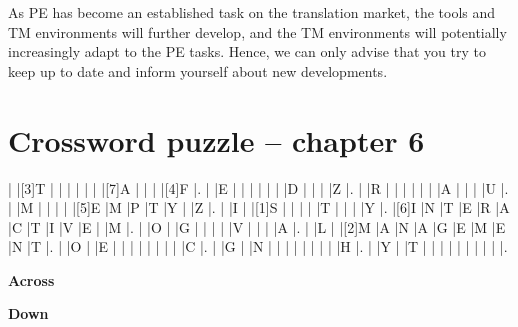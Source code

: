 As PE has become an established task on the translation market, the tools and TM environments will further develop, and the TM environments will potentially increasingly adapt to the PE tasks. Hence, we can only advise that you try to keep up to date and inform yourself about new developments.

\newpage

\section*{Crossword puzzle -- chapter 6}

\begin{Puzzle}{13}{11}
|{}	|[3]T	|{}	|{}	|{}	|{}	|{}	|{}	|[7]A	|{}	|{}	|{}	|[4]F	|.
|{}	|E	|{}	|{}	|{}	|{}	|{}	|{}	|D	|{}	|{}	|{}	|Z |.
|{}	|R	|{}	|{}	|{}	|{}	|{}	|{}	|A	|{}	|{}	|{}	|U |.
|{}	|M	|{}	|{}	|{}	|{}	|[5]E	|M	|P	|T	|Y	|{}	|Z |.
|{}	|I	|{}	|[1]S	|{}	|{}	|{}	|{}	|T	|{}	|{}	|{}	|Y |.
|[6]I	|N	|T	|E	|R	|A	|C	|T	|I	|V	|E	|{}	|M |.
|{}	|O	|{}	|G	|{}	|{}	|{}	|{}	|V	|{}	|{}	|{}	|A |.
|{}	|L	|{}	|[2]M	|A	|N	|A	|G	|E	|M	|E	|N	|T |.
|{}	|O	|{}	|E	|{}	|{}	|{}	|{}	|{}	|{}	|{}	|{}	|C |.
|{}	|G	|{}	|N	|{}	|{}	|{}	|{}	|{}	|{}	|{}	|{}	|H |.
|{}	|Y	|{}	|T	|{}	|{}	|{}	|{}	|{}	|{}	|{}	|{}	|{} |.
\end{Puzzle}

\begin{PuzzleClues}{\textbf{Across}}
\end{PuzzleClues}

\begin{PuzzleClues}{\textbf{Down}}
\end{PuzzleClues}
